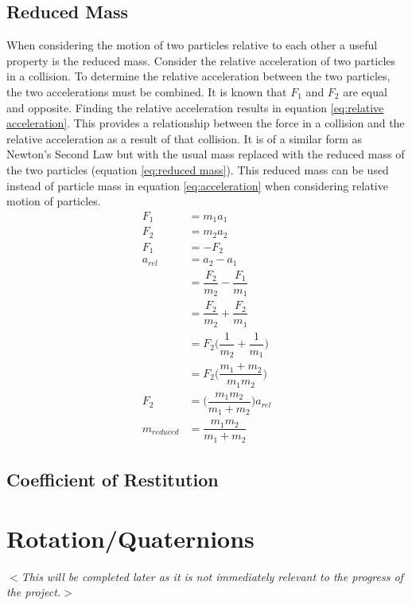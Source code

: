 \documentclass[10pt,a4paper,titlepage]{report}
\begin{document}
\subsection{Reduced Mass}
When considering the motion of two particles relative to each other a useful property is the reduced mass. Consider the relative acceleration of two particles in a collision. To determine the relative acceleration between the two particles, the two accelerations must be combined. It is known that $F_1$ and $F_2$ are equal and opposite. Finding the relative acceleration results in equation \ref{eq:relative acceleration}. This provides a relationship between the force in a collision and the relative acceleration as a result of that collision. It is of a similar form as Newton's Second Law but with the usual mass replaced with the reduced mass of the two particles (equation \ref{eq:reduced mass}). This reduced mass can be used instead of particle mass in equation \ref{eq:acceleration} when considering relative motion of particles.
\begin{align}
F_1 &= m_1 a_1 \nonumber
\\F_2 &= m_2 a_2 \nonumber
\\F_1 &= -F_2 \nonumber
\\a_{rel} &= a_2 - a_1 \nonumber
\\&= \dfrac{F_2}{m_2} - \dfrac{F_1}{m_1} \nonumber
\\&= \dfrac{F_2}{m_2} + \dfrac{F_2}{m_1} \nonumber
\\&= F_2 \Big(\dfrac{1}{m_2} + \dfrac{1}{m_1}\Big) \nonumber
\\&= F_2 \Big(\dfrac{m_1 + m_2}{m_1 m_2}\Big) \nonumber
\\F_2 &= \Big(\dfrac{m_1 m_2}{m_1 + m_2}\Big) a_{rel} \label{eq:relative acceleration}
\\m_{reduced} &= \dfrac{m_1 m_2}{m_1 + m_2} \label{eq:reduced mass}
\end{align}
\subsection{Coefficient of Restitution}
\section{Rotation/Quaternions}
\textit{$<$This will be completed later as it is not immediately relevant to the progress of the project.$>$}
\end{document}
